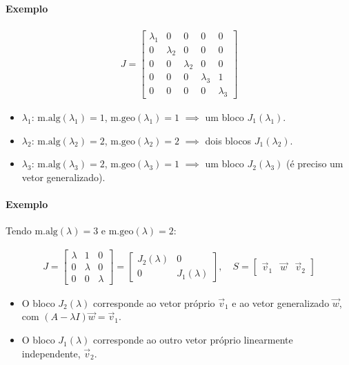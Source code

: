 \documentclass{article}
\begin{document}
\paragraph{Exemplo}

\begin{gather*}
J =
\begin{bmatrix}
\lambda_1 & 0 & 0 & 0 & 0 \\
0 & \lambda_2 & 0 & 0 & 0 \\
0 & 0 & \lambda_2 & 0 & 0 \\
0 & 0 & 0 & \lambda_3 & 1 \\
0 & 0 & 0 & 0 & \lambda_3
\end{bmatrix}
\end{gather*}

\begin{itemize}
    \item $\lambda_1$: $\text{m.alg}(\lambda_1) = 1$, $\text{m.geo}(\lambda_1) = 1$
    $\implies$ um bloco $J_1(\lambda_1)$.
    \item $\lambda_2$: $\text{m.alg}(\lambda_2) = 2$, $\text{m.geo}(\lambda_2) = 2$
    $\implies$ dois blocos $J_1(\lambda_2)$.
    \item $\lambda_3$: $\text{m.alg}(\lambda_3) = 2$, $\text{m.geo}(\lambda_3) = 1$
    $\implies$ um bloco $J_2(\lambda_3)$ (é preciso um vetor generalizado).
\end{itemize}

\paragraph{Exemplo}

Tendo $\text{m.alg}(\lambda) = 3$ e $\text{m.geo}(\lambda) = 2$:

\begin{gather*}
J =
\begin{bmatrix}
\lambda & 1 & 0 \\
0 & \lambda & 0 \\
0 & 0 & \lambda
\end{bmatrix}
=
\begin{bmatrix}
J_2(\lambda) & 0 \\
0 & J_1(\lambda)
\end{bmatrix},
\quad
S =
\begin{bmatrix}
\vec{v}_1 & \vec{w} & \vec{v}_2
\end{bmatrix}
\end{gather*}

\begin{itemize}
    \item O bloco $J_2(\lambda)$ corresponde ao vetor próprio $\vec{v}_1$ e ao vetor generalizado $\vec{w}$,
    com $(A - \lambda I)\vec{w} = \vec{v}_1$.
    \item O bloco $J_1(\lambda)$ corresponde ao outro vetor próprio linearmente independente, $\vec{v}_2$.
\end{itemize}
\end{document}
